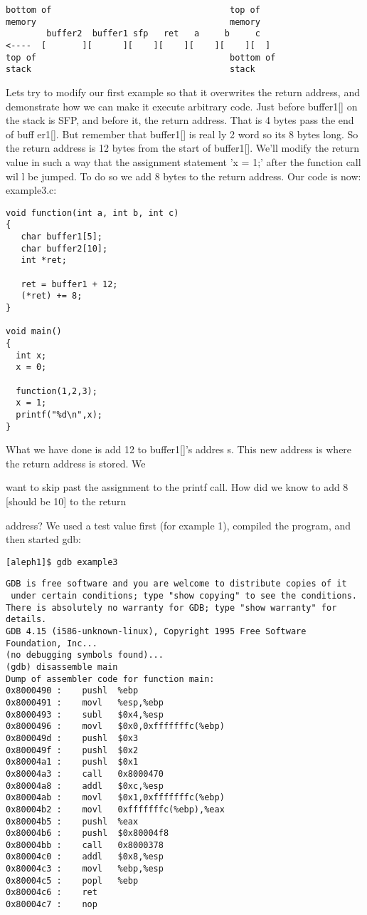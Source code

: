 \documentclass[10pt]{article}
\begin{document}
\begin{verbatim}
bottom of                                   top of
memory                                      memory
        buffer2  buffer1 sfp   ret   a     b     c
<----  [       ][      ][    ][    ][    ][    ][  ]
top of                                      bottom of
stack                                       stack
\end{verbatim}

Lets try to modify our first example so that it overwrites the return address, and demonstrate how we can make 
it execute arbitrary code. Just before buffer1[] on the stack is SFP, and before it, the return address. That is 4 
bytes pass the end of buff er1[]. But remember that buffer1[] is real ly 2 word so its 8 bytes long. So the return 
address is 12 bytes from the start of buffer1[]. We'll modify the return value in such a way that the assignment 
statement 'x = 1;' after the function call wil l be jumped. To do so we add 8 bytes to the return address. 
Our code is now: example3.c:

\begin{lstlisting}
void function(int a, int b, int c) 
{
   char buffer1[5];
   char buffer2[10];
   int *ret;

   ret = buffer1 + 12;
   (*ret) += 8;
}

void main() 
{
  int x;
  x = 0;

  function(1,2,3);
  x = 1;
  printf("%d\n",x);
}
\end{lstlisting}

What we have done is add 12 to buffer1[]'s addres s. This new address is where the return address is stored. We 

want to skip past the assignment to the printf call. How did we know to add 8 [should be 10] to the return 

address? We used a test value first (for example 1), compiled the program, and  then started gdb:

\begin{lstlisting}
[aleph1]$ gdb example3
\end{lstlisting}


\begin{lstlisting}
GDB is free software and you are welcome to distribute copies of it
 under certain conditions; type "show copying" to see the conditions.
There is absolutely no warranty for GDB; type "show warranty" for details.
GDB 4.15 (i586-unknown-linux), Copyright 1995 Free Software Foundation, Inc...
(no debugging symbols found)...
(gdb) disassemble main
Dump of assembler code for function main:
0x8000490 :    pushl  %ebp
0x8000491 :    movl   %esp,%ebp
0x8000493 :    subl   $0x4,%esp
0x8000496 :    movl   $0x0,0xfffffffc(%ebp)
0x800049d :    pushl  $0x3
0x800049f :    pushl  $0x2
0x80004a1 :    pushl  $0x1
0x80004a3 :    call   0x8000470 
0x80004a8 :    addl   $0xc,%esp
0x80004ab :    movl   $0x1,0xfffffffc(%ebp)
0x80004b2 :    movl   0xfffffffc(%ebp),%eax
0x80004b5 :    pushl  %eax
0x80004b6 :    pushl  $0x80004f8
0x80004bb :    call   0x8000378 
0x80004c0 :    addl   $0x8,%esp
0x80004c3 :    movl   %ebp,%esp
0x80004c5 :    popl   %ebp
0x80004c6 :    ret
0x80004c7 :    nop
\end{lstlisting}
\end{document}
